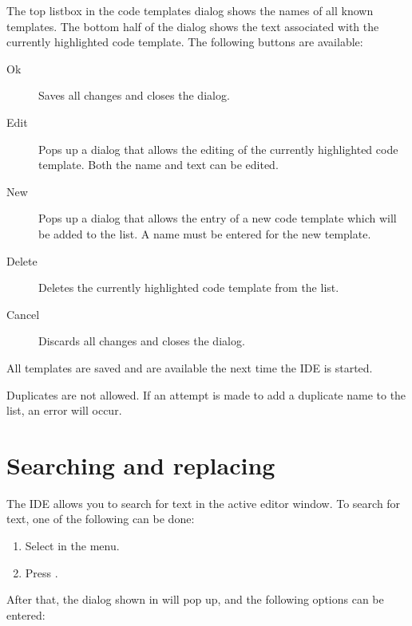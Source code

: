 
The top listbox in the code templates dialog shows the names of all
known templates. The bottom half of the dialog shows the text associated
with the currently highlighted code template.
The following buttons are available:
\begin{description}
\item[Ok] Saves all changes and closes the dialog.
\item[Edit] Pops up a dialog that allows the editing of the currently
highlighted code template. Both the name and text can be edited.
\item[New] Pops up a dialog that allows the entry of a new code template
which will be added to the list. A name must be entered for the new
template.
\item[Delete] Deletes the currently highlighted code template from the list.
\item[Cancel] Discards all changes and closes the dialog.
\end{description}
All templates are saved and are available the next time the IDE is started.
\begin{remark}
Duplicates are not allowed. If an attempt is made to add a duplicate name
to the list, an error will occur.
\end{remark}

\section{Searching and replacing}
\label{se:searching}
The IDE allows you to search for text in the active editor window.
To search for text, one of the following can be done:
\begin{enumerate}
\item Select  in the menu.
\item Press .
\end{enumerate}
After that, the dialog shown in  will pop up,
and the following options can be entered:



